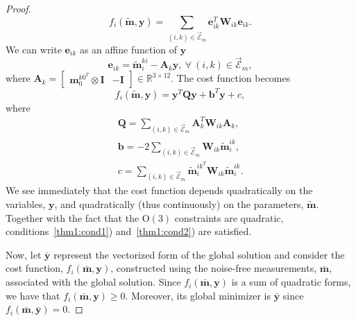 \documentclass[lettersize,journal]{IEEEtran}
\newcommand{\EdgeSet}{\vec{\bm{\mathcal{E}}}}
\begin{document}
\begin{proof}
\begin{equation}
	f_i(\tilde{\bm{m}},\bm{y}) = \sum\limits_{(i,k)\in\EdgeSet_m} \bm{e}_{ik}^T \bm{W}_{ik} \bm{e}_{ik}.
\end{equation}
We can write $\bm{e}_{ik}$ as an affine function of $\bm{y}$
\begin{equation}
	\bm{e}_{ik} = \tilde{\bm{m}}_i^{ki} - \bm{A}_k \bm{y}, ~\forall ~(i,k)\in \EdgeSet_m,
\end{equation}
where $\bm{A}_k = \begin{bmatrix} \bm{m}_0^{k0^T}\otimes\bm{I}& -\bm{I} \end{bmatrix}\in\mathbb{R}^{3\times12}$. The cost function becomes 
\begin{equation}
	f_i(\tilde{\bm{m}},\bm{y}) = \bm{y}^T \bm{Q} \bm{y} + \bm{b}^T \bm{y} + c, 
\end{equation}
where
\begin{gather}
	\bm{Q} = \sum\limits_{(i,k)\in\EdgeSet_m} \bm{A}_k^T \bm{W}_{ik} \bm{A}_k, \\
	\bm{b} = -2\sum\limits_{(i,k)\in\EdgeSet_m} \bm{W}_{ik}\tilde{\bm{m}}_i^{ik}, \\
	c=\sum\limits_{(i,k)\in\EdgeSet_m} \tilde{\bm{m}}_i^{ik^T}\bm{W}_{ik}\tilde{\bm{m}}_i^{ik}.
\end{gather}
We see immediately that the cost function depends quadratically on the variables, $\bm{y}$, and quadratically (thus continuously) on the parameters, $\tilde{\bm{m}}$. Together with the fact that the $\mbox{O}(3)$ constraints are quadratic, conditions~\ref{thm1:cond1}) and~\ref{thm1:cond2}) are satisfied.

Now, let $\bar{\bm{y}}$ represent the vectorized form of the global solution and consider the cost function, $f_i(\bar{\bm{m}},\bm{y})$, constructed using the noise-free measurements, $\bar{\bm{m}}$, associated with the global solution. Since $f_i(\bar{\bm{m}},\bm{y})$ is a sum of quadratic forms, we have that $f_i(\bar{\bm{m}},\bm{y})\geq 0$. Moreover, its global minimizer is $\bar{\bm{y}} $ since $f_i(\bar{\bm{m}},\bar{\bm{y}})= 0$. 


\end{proof}
\end{document}
